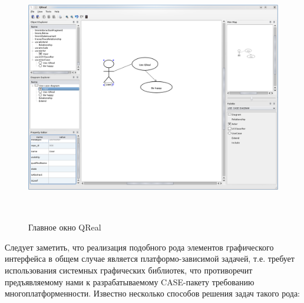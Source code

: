 \documentclass[a5paper]{article}
\begin{document}
\begin{figure} [ht]
  \begin{center}
    \includegraphics[width=14.704cm,height=10.918cm]{draft04-img1.png}
    \caption{Главное окно QReal}
    \label{mainWindow}
  \end{center}
\end{figure}


Следует заметить, что реализация подобного рода элементов графического
интерфейса в общем случае является платформо-зависимой задачей, т.е.
требует использования системных графических библиотек, что противоречит
предъявляемому нами к разрабатываемому CASE-пакету требованию
многоплатформенности. Известно несколько способов решения задач такого
рода:
\end{document}
